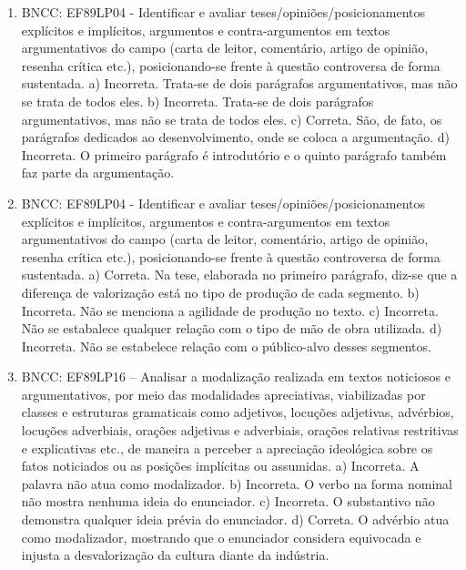 
\begin{enumerate}
\item
BNCC: EF89LP04 - Identificar e avaliar teses/opiniões/posicionamentos
explícitos e implícitos, argumentos e contra-argumentos em textos
argumentativos do campo (carta de leitor, comentário, artigo de opinião,
resenha crítica etc.), posicionando-se frente à questão controversa de
forma sustentada.
a) Incorreta. Trata-se de dois parágrafos argumentativos, mas não se
trata de todos eles. b) Incorreta. Trata-se de dois parágrafos
argumentativos, mas não se trata de todos eles. c) Correta. São, de
fato, os parágrafos dedicados ao desenvolvimento, onde se coloca a
argumentação. d) Incorreta. O primeiro parágrafo é introdutório e o
quinto parágrafo também faz parte da argumentação.

\item
BNCC: EF89LP04 - Identificar e avaliar teses/opiniões/posicionamentos
explícitos e implícitos, argumentos e contra-argumentos em textos
argumentativos do campo (carta de leitor, comentário, artigo de opinião,
resenha crítica etc.), posicionando-se frente à questão controversa de
forma sustentada.
a) Correta. Na tese, elaborada no primeiro parágrafo, diz-se que a
diferença de valorização está no tipo de produção de cada segmento. b)
Incorreta. Não se menciona a agilidade de produção no texto. c)
Incorreta. Não se estabalece qualquer relação com o tipo de mão de obra
utilizada. d) Incorreta. Não se estabelece relação com o público-alvo
desses segmentos.

\item
BNCC: EF89LP16 -- Analisar a modalização realizada em textos noticiosos
e argumentativos, por meio das modalidades apreciativas, viabilizadas
por classes e estruturas gramaticais como adjetivos, locuções adjetivas,
advérbios, locuções adverbiais, orações adjetivas e adverbiais, orações
relativas restritivas e explicativas etc., de maneira a perceber a
apreciação ideológica sobre os fatos noticiados ou as posições
implícitas ou assumidas.
a) Incorreta. A palavra não atua como modalizador. b) Incorreta. O verbo
na forma nominal não mostra nenhuma ideia do enunciador. c) Incorreta. O
substantivo não demonstra qualquer ideia prévia do enunciador. d)
Correta. O advérbio atua como modalizador, mostrando que o enunciador
considera equivocada e injusta a desvalorização da cultura diante da
indústria.


\end{enumerate}
